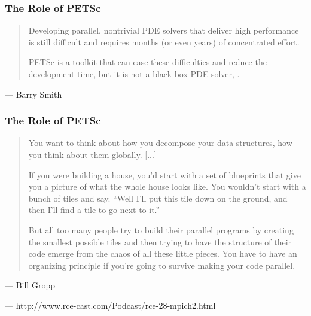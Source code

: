 \begin{frame}[fragile]

\frametitle{The Role of PETSc}

\vspace*{\fill}
\begin{minipage}{\linewidth}
\begin{quote}
\Large Developing parallel, nontrivial PDE solvers that deliver high performance is still difficult and requires
months (or even years) of concentrated effort.

\medskip

PETSc is a toolkit that can ease these difficulties and reduce the development time, but it is not a black-box PDE
solver, \color{blue}{nor a silver bullet}.
\end{quote}
\qquad --- Barry Smith
\end{minipage}


\end{frame}



\begin{frame}[fragile]

\frametitle{The Role of PETSc}

\vspace*{\fill}
\begin{minipage}{\linewidth}
\begin{quote}
\Large You want to think about how you decompose your data
structures, how you think about them globally. [...] 

\medskip 

If you
were building a house, you'd start with a set of blueprints
that give you a picture of what the whole house looks
like. You wouldn’t start with a bunch of tiles and say.
``Well I'll put this tile down on the ground, and then I'll
find a tile to go next to it.''

\medskip

But all too many people try to
build their parallel programs by creating the smallest
possible tiles and then trying to have the structure of
their code emerge from the chaos of all these little
pieces. You have to have an organizing principle if
you're going to survive making your code parallel.

\end{quote}

\qquad --- Bill Gropp

\qquad --- http://www.rce-cast.com/Podcast/rce-28-mpich2.html
\end{minipage}
\vspace*{\fill}\vspace*{\fill}

\end{frame}
